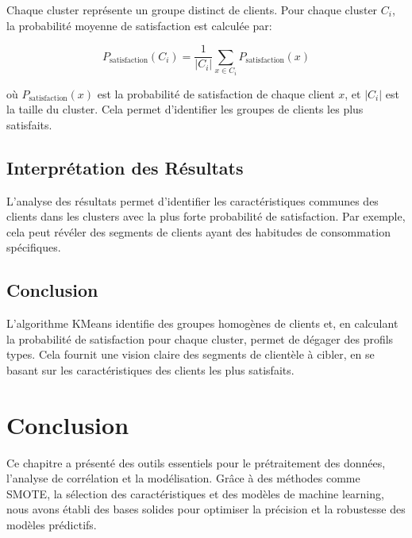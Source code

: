 Chaque cluster représente un groupe distinct de clients. Pour chaque cluster \( C_i \), la probabilité moyenne de satisfaction est calculée par:

\[
P_{\text{satisfaction}}(C_i) = \frac{1}{|C_i|} \sum_{x \in C_i} P_{\text{satisfaction}}(x)
\]

où \( P_{\text{satisfaction}}(x) \) est la probabilité de satisfaction de chaque client \( x \), et \( |C_i| \) est la taille du cluster. Cela permet d'identifier les groupes de clients les plus satisfaits.

\subsection{Interprétation des Résultats}

L'analyse des résultats permet d'identifier les caractéristiques communes des clients dans les clusters avec la plus forte probabilité de satisfaction. Par exemple, cela peut révéler des segments de clients ayant des habitudes de consommation spécifiques.

\subsection{Conclusion}

L'algorithme KMeans identifie des groupes homogènes de clients et, en calculant la probabilité de satisfaction pour chaque cluster, permet de dégager des profils types. Cela fournit une vision claire des segments de clientèle à cibler, en se basant sur les caractéristiques des clients les plus satisfaits.

\section{Conclusion}

Ce chapitre a présenté des outils essentiels pour le prétraitement des données, l’analyse de corrélation et la modélisation. Grâce à des méthodes comme SMOTE, la sélection des caractéristiques et des modèles de machine learning, nous avons établi des bases solides pour optimiser la précision et la robustesse des modèles prédictifs.

